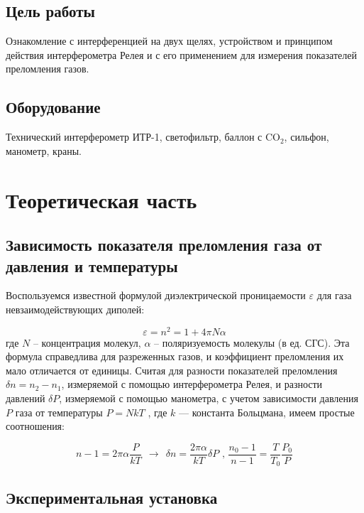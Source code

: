 \subsection{Цель работы} 

	Ознакомление с интерференцией на двух щелях, устройством и принципом действия интерферометра Релея и с его применением для измерения показателей преломления газов.

\subsection{Оборудование}

	Технический интерферометр ИТР-1, светофильтр, баллон с CO$_2$, сильфон, манометр, краны.

\section{Теоретическая часть}

\subsection{Зависимость показателя преломления газа от давления и температуры}

	Воспользуемся известной формулой диэлектрической проницаемости $\varepsilon$ для газа невзаимодействующих диполей: 

$$\varepsilon = n^2 = 1 + 4\pi N \alpha$$ 
где $N$ -- концентрация молекул, $\alpha$ -- поляризуемость молекулы (в ед. СГС). Эта формула справедлива для разреженных газов, и коэффициент преломления их мало отличается от единицы. Считая для разности показателей преломления $\delta n = n_2 - n_1$, измеряемой с помощью интерферометра Релея, и разности давлений $\delta P$, измеряемой с помощью манометра, с учетом зависимости давления $P$ газа от температуры $P = NkT$ , где $k$ — константа Больцмана, имеем простые соотношения: 

\begin{equation}
n-1 = 2\pi\alpha\frac{P}{kT}\:\:\rightarrow\:\: \delta n = \frac{2\pi\alpha}{kT}\delta P \text{  ,  } \frac{n_0 - 1}{n-1} = \frac{T}{T_0}\frac{P_0}{P}
\label{1}
\end{equation}

\subsection{Экспериментальная установка}

